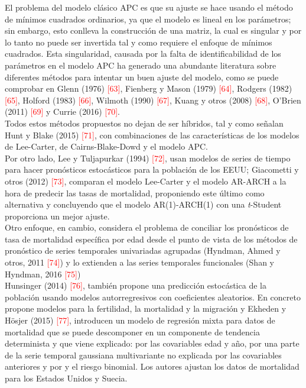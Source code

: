 \vspace{0.3cm}
El problema del modelo clásico APC es que su ajuste se hace usando el método de mínimos cuadrados ordinarios, ya que el modelo es lineal en los parámetros; sin embargo, esto conlleva la construcción de una matriz, la cual es singular y por lo tanto no puede ser invertida tal y como requiere el enfoque de mínimos cuadrados. Esta singularidad, causada por la falta de identificabilidad de los parámetros en el modelo APC ha generado una abundante literatura sobre diferentes métodos para intentar un buen ajuste del modelo, como se puede comprobar en Glenn (1976) \textcolor{red}{[63]}, Fienberg y Mason (1979) \textcolor{red}{[64]}, Rodgers (1982) \textcolor{red}{[65]}, Holford (1983) \textcolor{red}{[66]}, Wilmoth (1990) \textcolor{red}{[67]}, Kuang y otros (2008) \textcolor{red}{[68]},  O'Brien (2011) \textcolor{red}{[69]} y Currie (2016) \textcolor{red}{[70]}.\\

Todos estos métodos propuestos no dejan de ser híbridos, tal y como señalan Hunt y Blake (2015) \textcolor{red}{[71]}, con combinaciones de las características de los modelos de Lee-Carter, de Cairns-Blake-Dowd y el modelo APC.\\

Por otro lado, Lee y Tuljapurkar (1994) \textcolor{red}{[72]}, usan modelos de series de tiempo para hacer pronósticos estocásticos para la población de los EEUU; Giacometti y otros (2012) \textcolor{red}{[73]}, comparan el modelo Lee-Carter y el modelo AR-ARCH a la hora de predecir las tasas de mortalidad, proponiendo este último como alternativa y concluyendo que el modelo AR(1)-ARCH(1) con una \textit{t}-Student proporciona un mejor ajuste. \\

Otro enfoque, en cambio, considera el problema de conciliar los pronósticos de tasa de mortalidad específica por edad desde el punto de vista de los métodos de pronóstico de series temporales univariadas agrupadas (Hyndman, Ahmed y otros, 2011 \textcolor{red}{[74]}) y lo extienden a las series temporales funcionales (Shan y Hyndman, 2016 \textcolor{red}{[75]})\\ 

Hunsinger (2014) \textcolor{red}{[76]}, también propone una predicción estocástica de la población usando modelos autorregresivos con coeficientes aleatorios. En concreto propone modelos para la fertilidad, la mortalidad y la migración y Ekheden y H\"osjer (2015) \textcolor{red}{[77]}, introducen un modelo de regresión mixta para datos de mortalidad que se puede descomponer en un componente de tendencia determinista y que viene explicado: por las covariables edad y año, por una parte de la serie temporal gaussiana multivariante no explicada por las covariables anteriores y por y el riesgo binomial. Los autores ajustan los datos de mortalidad para los Estados Unidos y Suecia.\\
 
